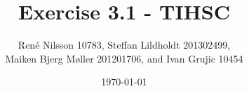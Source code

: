 \documentclass[]{report}
\begin{document}
\title{Exercise 3.1 - TIHSC}
\author{René Nilsson 10783, Steffan Lildholdt 201302499,\\ Maiken Bjerg Møller 201201706, and Ivan Grujic 10454}
\date{\today}
\maketitle
{}

\tableofcontents











\end{document}
